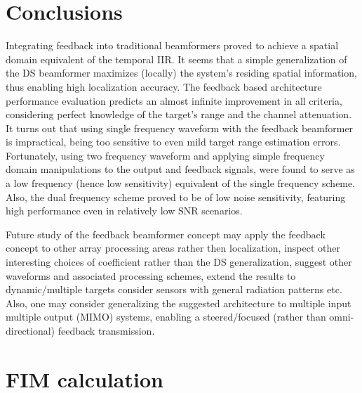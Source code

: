 \documentclass[journal]{IEEEtran}
\begin{document}
\section{Conclusions}
\label{sec_conclusions}
Integrating feedback into traditional beamformers proved to achieve a spatial domain equivalent of the temporal IIR.
It seems that a simple generalization of the DS beamformer maximizes (locally) the system's residing spatial information, thus enabling high localization accuracy.
The feedback based architecture performance evaluation predicts an almost infinite improvement in all criteria, considering perfect knowledge of the target's range and the channel attenuation.
It turns out that using single frequency waveform with the feedback beamformer is impractical, being too sensitive to even mild target range estimation errors.
Fortunately, using two frequency waveform and applying simple frequency domain manipulations to the output and feedback signals, were found to serve as a low frequency (hence low sensitivity) equivalent of the single frequency scheme.
Also, the dual frequency scheme proved to be of low noise sensitivity, featuring high performance even in relatively low SNR scenarios.
\par Future study of the feedback beamformer concept may apply the feedback concept to other array processing areas rather then localization, inspect other interesting choices of coefficient rather than the DS generalization, suggest other waveforms and associated processing schemes, extend the results to dynamic/multiple targets consider sensors with general radiation patterns etc.
Also, one may consider generalizing the suggested architecture to multiple input multiple output (MIMO) systems, enabling a steered/focused (rather than omni-directional) feedback transmission.
\appendices
\section{FIM calculation}
\label{apdx_clacFim}

\end{document}
